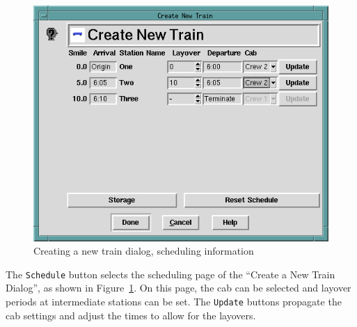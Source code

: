 \begin{figure}[hbpt]
\begin{centering}   
\includegraphics[width=5in]{TTCreateNewTrain2.png}
\caption{Creating a new train dialog, scheduling information}
\label{fig:tt:CreateNewTrain2}
\end{centering}
\end{figure}
The \texttt{Schedule} button selects the scheduling page of the ``Create a
New Train Dialog'', as shown in Figure~\ref{fig:tt:CreateNewTrain2}.  On
this page, the cab can be selected and layover periods at intermediate
stations can be set.  The \texttt{Update} buttons propagate the cab
settings and adjust the times to allow for the layovers.

